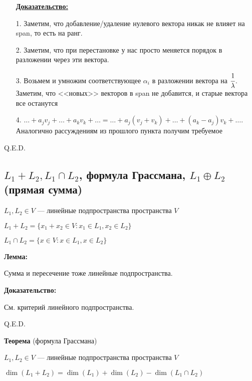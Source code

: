 \begin{enumerate}
    \item[] \textbf{\uline{Доказательство:}}
    \item[1.] Заметим, что добавление/удаление нулевого вектора никак не влияет на span, то есть на ранг.
    \item[2.] Заметим, что при перестановке у нас просто меняется порядок в разложении через эти вектора.
    \item[3.] Возьмем и умножим соответствующее $\alpha_i$ в разложении вектора на $\cfrac{1}{\lambda}$. Заметим, что <<новых>> векторов в span не добавится, и старые вектора все останутся
    \item[4.] $\ldots + a_j v_j + \ldots  + a_kv_k + \ldots = \ldots  + a_j (v_j + v_k) + \ldots  + (a_k-a_j)v_k + \ldots $. Аналогично рассуждениям из прошлого пункта получим требуемое
\end{enumerate}
\hfill Q.E.D.

\subsection{\(L_1 + L_2, L_1 \cap L_2\), формула Грассмана, \(L_1 \oplus L_2\) (прямая сумма)}

\(L_1, L_2 \in V\) --- линейные подпространства пространства \(V\)

\(L_1 + L_2 = \{ x_1 + x_2 \in V : x_1 \in L_1, x_2 \in L_2 \}\)

\(L_1 \cap L_2 = \{ x \in V : x \in L_1, x \in L_2 \}\)

\textbf{Лемма:}

Сумма и пересечение тоже линейные подпространства.

\textbf{Доказательство:}

См. критерий линейного подпространства.

\hfill Q.E.D.

\textbf{Теорема} (формула Грассмана)

\(L_1, L_2 \in V\) --- линейные подпространства пространства \(V\)

\(\dim (L_1 + L_2) = \dim (L_1) + \dim (L_2) - \dim (L_1 \cap L_2)\)

